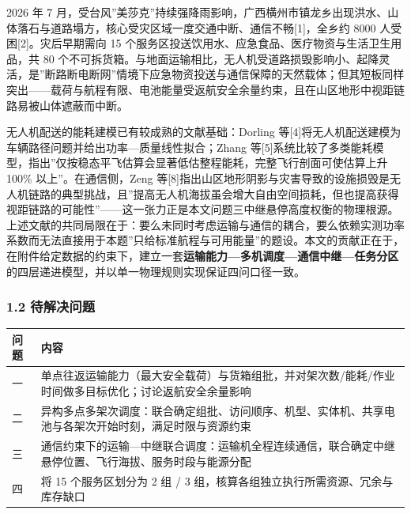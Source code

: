 \documentclass[
  10.5pt,
]{extarticle}
\newcounter{none} %
\begin{document}
2026 年 7
月，受台风''美莎克''持续强降雨影响，广西横州市镇龙乡出现洪水、山体落石与道路塌方，核心受灾区域一度交通中断、通信不畅{[}1{]}，全乡约
8000 人受困{[}2{]}。灾后早期需向 15
个服务区投送饮用水、应急食品、医疗物资与生活卫生用品，共 80
个不可拆货箱。与地面运输相比，无人机受道路损毁影响小、起降灵活，是''断路断电断网''情境下应急物资投送与通信保障的天然载体；但其短板同样突出------载荷与航程有限、电池能量受返航安全余量约束，且在山区地形中视距链路易被山体遮蔽而中断。

无人机配送的能耗建模已有较成熟的文献基础：Dorling
等{[}4{]}将无人机配送建模为车辆路径问题并给出功率---质量线性拟合；Zhang
等{[}5{]}系统比较了多类能耗模型，指出''仅按稳态平飞估算会显著低估整程能耗，完整飞行剖面可使估算上升
100\% 以上''。在通信侧，Zeng
等{[}8{]}指出山区地形阴影与灾害导致的设施损毁是无人机链路的典型挑战，且''提高无人机海拔虽会增大自由空间损耗，但也提高获得视距链路的可能性''------这一张力正是本文问题三中继悬停高度权衡的物理根源。上述文献的共同局限在于：要么未同时考虑运输与通信的耦合，要么依赖实测功率系数而无法直接用于本题''只给标准航程与可用能量''的题设。本文的贡献正在于，在附件给定数据的约束下，建立一套\textbf{运输能力---多机调度---通信中继---任务分区}的四层递进模型，并以单一物理规则实现保证四问口径一致。

\subsubsection{1.2 待解决问题}\label{ux5f85ux89e3ux51b3ux95eeux9898}

{\def\LTcaptype{none} %
\begin{longtable}[]{@{}
  >{\raggedright\arraybackslash}p{}
  >{\raggedright\arraybackslash}p{}@{}}
\toprule\noalign{}
\begin{minipage}[b]{\linewidth}\raggedright
问题
\end{minipage} & \begin{minipage}[b]{\linewidth}\raggedright
内容
\end{minipage} \\
\midrule\noalign{}
\endhead
\bottomrule\noalign{}
\endlastfoot
一 &
单点往返运输能力（最大安全载荷）与货箱组批，并对架次数/能耗/作业时间做多目标优化；讨论返航安全余量影响 \\
二 &
异构多点多架次调度：联合确定组批、访问顺序、机型、实体机、共享电池与各架次开始时刻，满足时限与资源约束 \\
三 &
通信约束下的运输---中继联合调度：运输机全程连续通信，联合确定中继悬停位置、飞行海拔、服务时段与能源分配 \\
四 & 将 15 个服务区划分为 2 组 / 3
组，核算各组独立执行所需资源、冗余与库存缺口 \\
\end{longtable}
}
\end{document}
